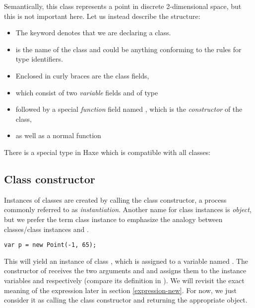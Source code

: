 \documentclass{haxe}
\begin{document}
Semantically, this class represents a point in discrete 2-dimensional space, but this is not important here. Let us instead describe the structure:

\begin{itemize}
	\item The keyword  denotes that we are declaring a class.
	\item {} is the name of the class and could be anything conforming to the rules for type identifiers.
	\item Enclosed in curly braces \expr{$\left\{\right\}$} are the class fields,
	\item which consist of two \emph{variable} fields  and  of type 
	\item followed by a special \emph{function} field named , which is the \emph{constructor} of the class,
	\item as well as a normal function 
\end{itemize}
There is a special type in Haxe which is compatible with all classes:




\subsection{Class constructor}
\label{types-class-constructor}

Instances of classes are created by calling the class constructor, a process commonly referred to as \emph{instantiation}. Another name for class instances is \emph{object}, but we prefer the term class instance to emphasize the analogy between classes/class instances and . 

\begin{lstlisting}
var p = new Point(-1, 65);
\end{lstlisting}
This will yield an instance of class , which is assigned to a variable named . The constructor of  receives the two arguments  and  and assigns them to the instance variables  and  respectively (compare its definition in ). We will revisit the exact meaning of the  expression later in section \ref{expression-new}. For now, we just consider it as calling the class constructor and returning the appropriate object.
\end{document}
